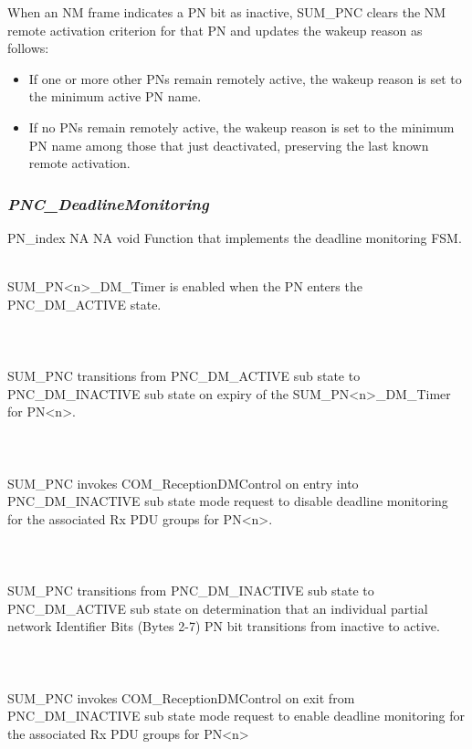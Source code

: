 When an NM frame indicates a PN bit as inactive, SUM\_PNC clears the NM remote activation criterion for that PN and updates the wakeup reason as follows:
\begin{itemize}
  \item If one or more other PNs remain remotely active, the wakeup reason is set to the minimum active PN name.
  \item If no PNs remain remotely active, the wakeup reason is set to the minimum PN name among those that just deactivated, preserving the last known remote activation.
\end{itemize}

{}


\subsubsection{\textit{PNC_DeadlineMonitoring}}

{  \hspace*{1.5in} \vrule \hspace*{0.1in} PN_index}
{NA}
{NA}
{void}
{Function that implements the deadline monitoring FSM.}



\\
SUM_PN<n>_DM_Timer is enabled when the PN enters the PNC_DM_ACTIVE state.
\\
\\
\\
\\
SUM_PNC transitions from PNC_DM_ACTIVE sub state to PNC_DM_INACTIVE sub state on expiry of the SUM_PN<n>_DM_Timer for PN<n>.
\\
\\
\\
\\
SUM_PNC invokes COM_ReceptionDMControl on entry into PNC_DM_INACTIVE sub state mode request to disable deadline monitoring for the associated Rx PDU groups for PN<n>.
\\
\\
\\
\\
SUM_PNC transitions from PNC_DM_INACTIVE sub state to PNC_DM_ACTIVE sub state on determination that an individual partial network Identifier Bits (Bytes 2-7) PN bit transitions from inactive to active.
\\
{}
\\
\\
\\
SUM_PNC invokes COM_ReceptionDMControl on exit from PNC_DM_INACTIVE sub state mode request to enable deadline monitoring for the associated Rx PDU groups for PN<n>
\\
{}
\\
\\

